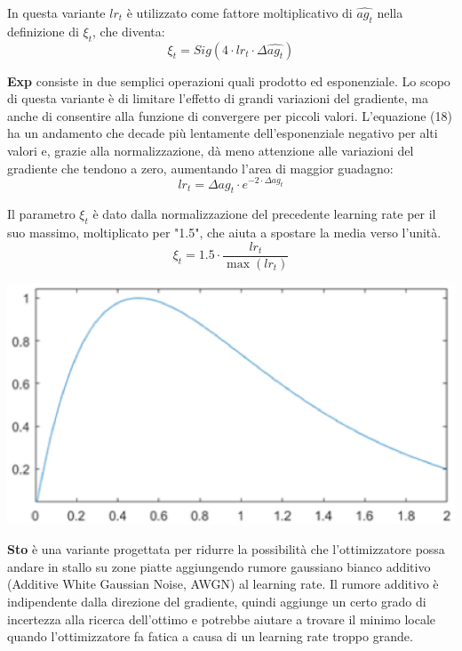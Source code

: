 In questa variante $lr_{t}$ è utilizzato come fattore moltiplicativo di $\hat{ag_{t}}$ nella definizione di $\xi_{t}$, che diventa:
\begin{equation}
	\xi_{t} = Sig(4 \cdot lr_{t} \cdot \Delta \hat{ag_{t}})
\end{equation}


\textbf{Exp} consiste in due semplici operazioni quali prodotto ed esponenziale. Lo scopo di questa variante è di limitare l'effetto di grandi variazioni del gradiente, ma anche di consentire alla funzione di convergere per piccoli valori. L'equazione (18) ha un andamento che decade più lentamente dell'esponenziale negativo per alti valori e, grazie alla normalizzazione, dà meno attenzione alle variazioni del gradiente che tendono a zero, aumentando l'area di maggior guadagno:
\begin{equation}
	lr_{t} = \Delta ag_{t} \cdot e^{-2\cdot\Delta ag_{t}}
\end{equation}

Il parametro $\xi_{t}$ è dato dalla normalizzazione del precedente learning rate per il suo massimo, moltiplicato per "1.5", che aiuta a spostare la media verso l'unità.
\begin{equation}
	\xi_{t} = 1.5 \cdot \frac{lr_{t}}{\max(lr_{t})}
\end{equation}

\vspace{0.25cm} 
\begin{center}
	\includegraphics[scale=0.5]{images/exp.eps} %
	\label{Figura 1.}
\end{center}
\vspace{0.25cm}


\textbf{Sto} è una variante progettata per ridurre la possibilità che l'ottimizzatore possa andare in stallo su zone piatte aggiungendo rumore gaussiano bianco additivo (Additive White Gaussian Noise, AWGN) al learning rate. Il rumore additivo è indipendente dalla direzione del gradiente, quindi aggiunge un certo grado di incertezza alla ricerca dell'ottimo e potrebbe aiutare a trovare il minimo locale quando l'ottimizzatore fa fatica a causa di un learning rate troppo grande.

